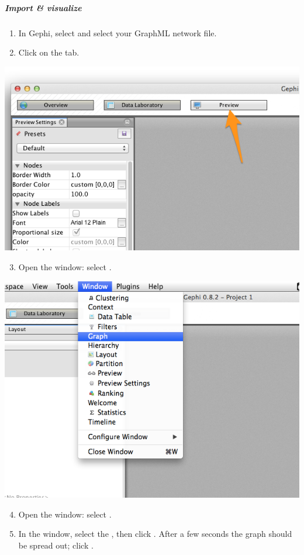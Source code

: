 \documentclass[letterpaper,10pt,english]{sphinxmanual}
\begin{document}
\subparagraph{Import \& visualize}
\label{tutorial.coauthors:import-visualize}\begin{enumerate}
\item {} 
In Gephi, select  and select your GraphML network file.

\item {} 
Click on the  tab.

\end{enumerate}

{\hfill\includegraphics{coauthors.22.png}\hfill}
\begin{enumerate}
\setcounter{enumi}{2}
\item {} 
Open the  window: select .

\end{enumerate}

{\hfill\includegraphics{coauthors.23.png}\hfill}
\begin{enumerate}
\setcounter{enumi}{3}
\item {} 
Open the  window: select .

\item {} 
In the  window, select the , then click .
After a few seconds the graph should be spread out; click .

\end{enumerate}
\end{document}
